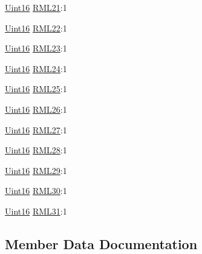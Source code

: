 \begin{DoxyCompactItemize}
\hyperlink{_d_s_p2833x___device_8h_a59a9f6be4562c327cbfb4f7e8e18f08b}{Uint16} \hyperlink{struct_c_a_n_r_m_l___b_i_t_s_a7cb6804045a50d74ab414fb348a3822d}{R\+M\+L21}\+:1
\item 
\hyperlink{_d_s_p2833x___device_8h_a59a9f6be4562c327cbfb4f7e8e18f08b}{Uint16} \hyperlink{struct_c_a_n_r_m_l___b_i_t_s_adcab598574592b715d6018afd4a32b7a}{R\+M\+L22}\+:1
\item 
\hyperlink{_d_s_p2833x___device_8h_a59a9f6be4562c327cbfb4f7e8e18f08b}{Uint16} \hyperlink{struct_c_a_n_r_m_l___b_i_t_s_a5636b125c3f2aca4d421fe4515efcccd}{R\+M\+L23}\+:1
\item 
\hyperlink{_d_s_p2833x___device_8h_a59a9f6be4562c327cbfb4f7e8e18f08b}{Uint16} \hyperlink{struct_c_a_n_r_m_l___b_i_t_s_ac175b8ea7e6bc261aabfc05c73a00d9b}{R\+M\+L24}\+:1
\item 
\hyperlink{_d_s_p2833x___device_8h_a59a9f6be4562c327cbfb4f7e8e18f08b}{Uint16} \hyperlink{struct_c_a_n_r_m_l___b_i_t_s_afbf53d91d3530dcbe06dc603313a076a}{R\+M\+L25}\+:1
\item 
\hyperlink{_d_s_p2833x___device_8h_a59a9f6be4562c327cbfb4f7e8e18f08b}{Uint16} \hyperlink{struct_c_a_n_r_m_l___b_i_t_s_af0cf705a6f67c2498e8f3c1736a510ca}{R\+M\+L26}\+:1
\item 
\hyperlink{_d_s_p2833x___device_8h_a59a9f6be4562c327cbfb4f7e8e18f08b}{Uint16} \hyperlink{struct_c_a_n_r_m_l___b_i_t_s_a7d70124a24f03dccbfc6a9a6f821e3fd}{R\+M\+L27}\+:1
\item 
\hyperlink{_d_s_p2833x___device_8h_a59a9f6be4562c327cbfb4f7e8e18f08b}{Uint16} \hyperlink{struct_c_a_n_r_m_l___b_i_t_s_a24b119e472dc2096c49e14a4f6213168}{R\+M\+L28}\+:1
\item 
\hyperlink{_d_s_p2833x___device_8h_a59a9f6be4562c327cbfb4f7e8e18f08b}{Uint16} \hyperlink{struct_c_a_n_r_m_l___b_i_t_s_ac1e2a3c6b246f48cbe99e30733bb9c4a}{R\+M\+L29}\+:1
\item 
\hyperlink{_d_s_p2833x___device_8h_a59a9f6be4562c327cbfb4f7e8e18f08b}{Uint16} \hyperlink{struct_c_a_n_r_m_l___b_i_t_s_af478fa5401af09c74a9ef29ad0e6bd75}{R\+M\+L30}\+:1
\item 
\hyperlink{_d_s_p2833x___device_8h_a59a9f6be4562c327cbfb4f7e8e18f08b}{Uint16} \hyperlink{struct_c_a_n_r_m_l___b_i_t_s_a69a3feaabaca23395130d5646a761070}{R\+M\+L31}\+:1
\end{DoxyCompactItemize}


\subsection{Member Data Documentation}
\hypertarget{struct_c_a_n_r_m_l___b_i_t_s_a07941bd586f80d375094dffedd609040}{}
